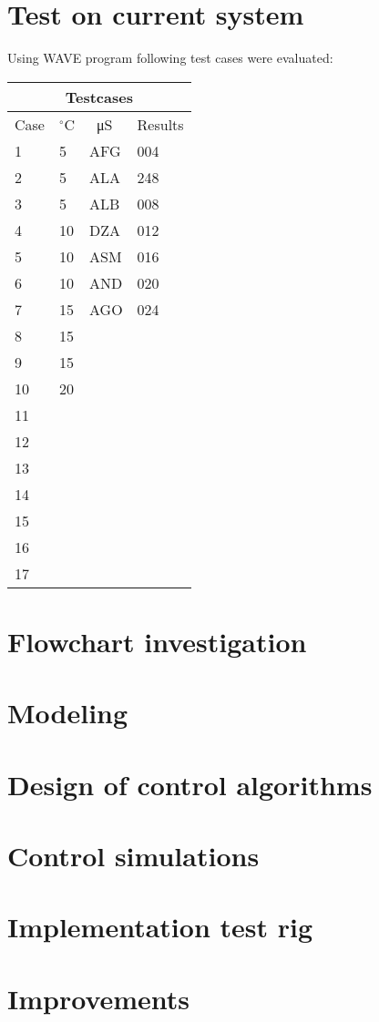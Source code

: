 
\section{Test on current system}
Using WAVE program following test cases were evaluated:

\begin{tabular}{ |p{0.6cm}||p{0.7cm}|p{1cm}|p{2cm}|  }
 \hline
 \multicolumn{4}{|c|}{Testcases} \\
 \hline
 Case&$^\circ$C&\SI{}{\micro\siemens}&Results \\
 \hline
 1   &   5  &AFG&   004\\
 2 &  5  & ALA   &248\\
 3 &5 & ALB&  008\\
 4   &10 & DZA&  012\\
 5 &   10  & ASM&016\\
 6 & 10  & AND   &020\\
 7 & 15  & AGO&024\\
 8 &15&&\\
 9&15&&\\
 10&20&&\\
 11&&&\\
 12&&&\\
 13 &&&\\
 14&&&\\
 15 &&&\\
 16&&&\\
 17&&&\\
\hline
\end{tabular}



\section{Flowchart investigation}

\section{Modeling}

\section{Design of control algorithms}

\section{Control simulations}

\section{Implementation test rig}

\section{Improvements}
